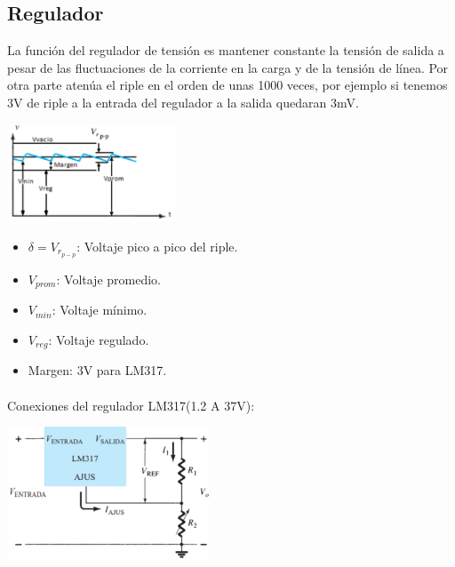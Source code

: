 \subsection{Regulador}
\sangria{} La función del regulador de tensión es mantener constante la tensión de
salida a pesar de las fluctuaciones de la corriente en la carga y de la
tensión de línea.
\sangria{} Por otra parte atenúa el riple en el orden de unas 1000 veces, por ejemplo
si tenemos 3V de riple a la entrada del regulador a la salida quedaran 3mV.

\begin{center}
    \includegraphics[width=5cm]{./imagenes/rplrg.png}
\end{center}

\begin{itemize}
    \item $\delta =V_{r_{p-p}}$: Voltaje pico a pico del riple.
    \item $V_{prom}$: Voltaje promedio.
    \item $V_{min}$: Voltaje mínimo.
    \item $V_{reg}$: Voltaje regulado.
    \item Margen: 3V para LM317.
\end{itemize}

\saltoPag{}

\paragraph{} Conexiones del regulador LM317(1.2 A 37V):
\vspace{0.5cm}
\begin{center}
    \includegraphics[width=6cm]{./imagenes/Diagrama317.png}
\end{center}

